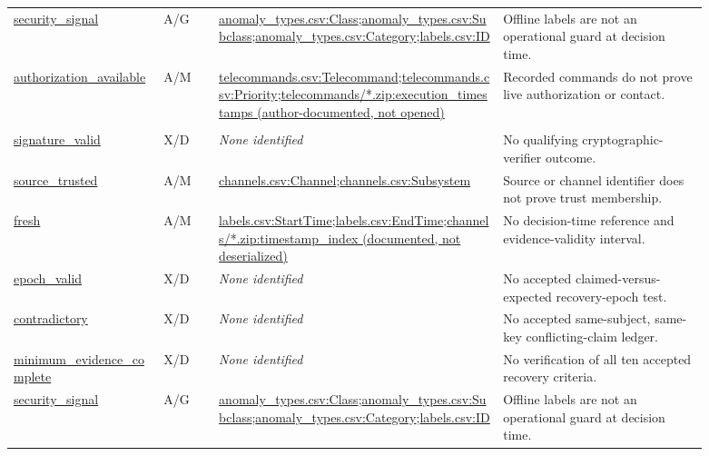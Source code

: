 \begin{longtable}{@{}>{\raggedright\arraybackslash}p{0.19\linewidth}>{\raggedright\arraybackslash}p{0.075\linewidth}>{\raggedright\arraybackslash}p{0.365\linewidth}>{\raggedright\arraybackslash}p{0.26\linewidth}@{}}
\url{security_signal} & A/G & \url{anomaly_types.csv:Class};\allowbreak \url{anomaly_types.csv:Subclass};\allowbreak \url{anomaly_types.csv:Category};\allowbreak \url{labels.csv:ID} & Offline labels are not an operational guard at decision time. \\
\url{authorization_available} & A/M & \url{telecommands.csv:Telecommand};\allowbreak \url{telecommands.csv:Priority};\allowbreak \url{telecommands/*.zip:execution_timestamps (author-documented, not opened)} & Recorded commands do not prove live authorization or contact. \\
\addlinespace[3pt]
\multicolumn{4}{@{}l}{\textbf{ESA v2 Mission 2}}\\
\url{signature_valid} & X/D & \emph{None identified} & No qualifying cryptographic-verifier outcome. \\
\url{source_trusted} & A/M & \url{channels.csv:Channel};\allowbreak \url{channels.csv:Subsystem} & Source or channel identifier does not prove trust membership. \\
\url{fresh} & A/M & \url{labels.csv:StartTime};\allowbreak \url{labels.csv:EndTime};\allowbreak \url{channels/*.zip:timestamp_index (documented, not deserialized)} & No decision-time reference and evidence-validity interval. \\
\url{epoch_valid} & X/D & \emph{None identified} & No accepted claimed-versus-expected recovery-epoch test. \\
\url{contradictory} & X/D & \emph{None identified} & No accepted same-subject, same-key conflicting-claim ledger. \\
\url{minimum_evidence_complete} & X/D & \emph{None identified} & No verification of all ten accepted recovery criteria. \\
\url{security_signal} & A/G & \url{anomaly_types.csv:Class};\allowbreak \url{anomaly_types.csv:Subclass};\allowbreak \url{anomaly_types.csv:Category};\allowbreak \url{labels.csv:ID} & Offline labels are not an operational guard at decision time. \\

\end{longtable}
